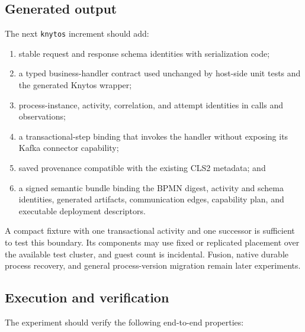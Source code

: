 \subsection{Generated output}

The next \texttt{knytos} increment should add:

\begin{enumerate}
    \item stable request and response schema identities with serialization code;
    \item a typed business-handler contract used unchanged by host-side unit
        tests and the generated Knytos wrapper;
    \item process-instance, activity, correlation, and attempt identities in
        calls and observations;
    \item a transactional-step binding that invokes the handler without
        exposing its Kafka connector capability;
    \item saved provenance compatible with the existing CLS2 metadata; and
    \item a signed semantic bundle binding the BPMN digest, activity and schema
        identities, generated artifacts, communication edges, capability plan,
        and executable deployment descriptors.
\end{enumerate}

A compact fixture with one transactional activity and one successor is
sufficient to test this boundary. Its components may use fixed or replicated
placement over the available test cluster, and guest count is incidental. Fusion,
native durable process recovery, and general process-version migration remain
later experiments.

\subsection{Execution and verification}

The experiment should verify the following end-to-end properties:

